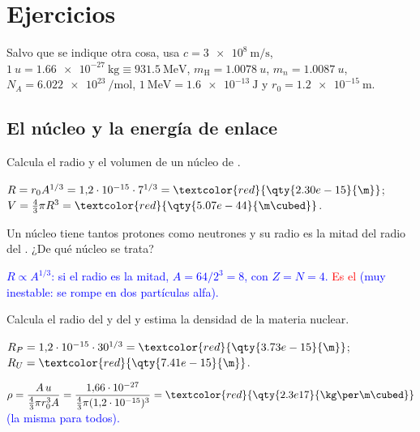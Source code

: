
\section{Ejercicios}\label{sec:nuc-ejercicios}

Salvo que se indique otra cosa, usa \(c = \qty{3e8}{\m\per\second}\), \(\qty{1}{u} = \qty{1.66e-27}{\kg} \equiv \qty{931.5}{\mega\electronvolt}\),
\(m_{\text{H}} = \qty{1.0078}{u}\), \(m_n = \qty{1.0087}{u}\), \(N_A = \qty{6.022e23}{\per\mol}\), \(\qty{1}{\mega\electronvolt} = \qty{1.6e-13}{\joule}\)
y \(r_0 = \qty{1.2e-15}{\m}\).

\subsection{El núcleo y la energía de enlace}

\begin{exercise}
    Calcula el radio y el volumen de un núcleo de .
    \begin{solu}
        \(R = r_0 A^{1/3} = 1{,}2\cdot 10^{-15}\cdot 7^{1/3} = \textcolor{red}{\qty{2.30e-15}{\m}}\); \(V = \tfrac{4}{3}\pi R^3 = \textcolor{red}{\qty{5.07e-44}{\m\cubed}}\).
    \end{solu}
\end{exercise}

\begin{exercise}
    Un núcleo tiene tantos protones como neutrones y su radio es la mitad del radio del . ¿De qué núcleo se trata?
    \begin{solu}
        \textcolor{blue}{\(R \propto A^{1/3}\): si el radio es la mitad, \(A = 64/2^3 = 8\), con \(Z = N = 4\).} \textcolor{red}{Es el }
        \textcolor{blue}{(muy inestable: se rompe en dos partículas alfa).}
    \end{solu}
\end{exercise}

\begin{exercise}
    Calcula el radio del  y del  y estima la densidad de la materia nuclear.
    \begin{solu}
        \(R_P = 1{,}2\cdot 10^{-15}\cdot 30^{1/3} = \textcolor{red}{\qty{3.73e-15}{\m}}\); \(R_U = \textcolor{red}{\qty{7.41e-15}{\m}}\).

        \(\rho = \dfrac{A\,u}{\tfrac{4}{3}\pi r_0^3 A} = \dfrac{1{,}66\cdot 10^{-27}}{\tfrac{4}{3}\pi(1{,}2\cdot 10^{-15})^3} = \textcolor{red}{\qty{2.3e17}{\kg\per\m\cubed}}\) \textcolor{blue}{(la misma para todos).}
    \end{solu}
\end{exercise}

